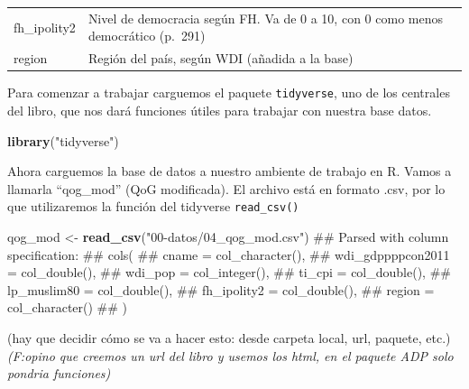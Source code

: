 \documentclass[]{book}
\newenvironment{Shaded}{\begin{snugshade}}{\end{snugshade}}
\newcommand{\KeywordTok}[1]{\textcolor[rgb]{0.13,0.29,0.53}{\textbf{#1}}}
\newcommand{\StringTok}[1]{\textcolor[rgb]{0.31,0.60,0.02}{#1}}
\newcommand{\NormalTok}[1]{#1}
\begin{document}
\begin{longtable}[]{@{}ll@{}}
\begin{minipage}[t]{0.16\columnwidth}
fh\_ipolity2\strut
\end{minipage} & \begin{minipage}[t]{0.78\columnwidth}\raggedright\strut
Nivel de democracia según FH. Va de 0 a 10, con 0 como menos democrático
(p.~291)\strut
\end{minipage}\tabularnewline
\begin{minipage}[t]{0.16\columnwidth}\raggedright\strut
region\strut
\end{minipage} & \begin{minipage}[t]{0.78\columnwidth}\raggedright\strut
Región del país, según WDI (añadida a la base)\strut
\end{minipage}\tabularnewline
\bottomrule
\end{longtable}

Para comenzar a trabajar carguemos el paquete \texttt{tidyverse}, uno de
los centrales del libro, que nos dará funciones útiles para trabajar con
nuestra base datos.

\begin{Shaded}
\begin{Highlighting}[]
\KeywordTok{library}\NormalTok{(}\StringTok{"tidyverse"}\NormalTok{)}
\end{Highlighting}
\end{Shaded}

Ahora carguemos la base de datos a nuestro ambiente de trabajo en R.
Vamos a llamarla ``qog\_mod'' (QoG modificada). El archivo está en
formato .csv, por lo que utilizaremos la función del tidyverse
\texttt{read\_csv()}

\begin{Shaded}
\begin{Highlighting}[]
\NormalTok{qog_mod <-}\StringTok{ }\KeywordTok{read_csv}\NormalTok{(}\StringTok{"00-datos/04_qog_mod.csv"}\NormalTok{)}
\NormalTok{## Parsed with column specification:}
\NormalTok{## cols(}
\NormalTok{##   cname = col_character(),}
\NormalTok{##   wdi_gdppppcon2011 = col_double(),}
\NormalTok{##   wdi_pop = col_integer(),}
\NormalTok{##   ti_cpi = col_double(),}
\NormalTok{##   lp_muslim80 = col_double(),}
\NormalTok{##   fh_ipolity2 = col_double(),}
\NormalTok{##   region = col_character()}
\NormalTok{## )}
\end{Highlighting}
\end{Shaded}

(hay que decidir cómo se va a hacer esto: desde carpeta local, url,
paquete, etc.) \emph{(F:opino que creemos un url del libro y usemos los
html, en el paquete ADP solo pondria funciones)}
\end{document}
